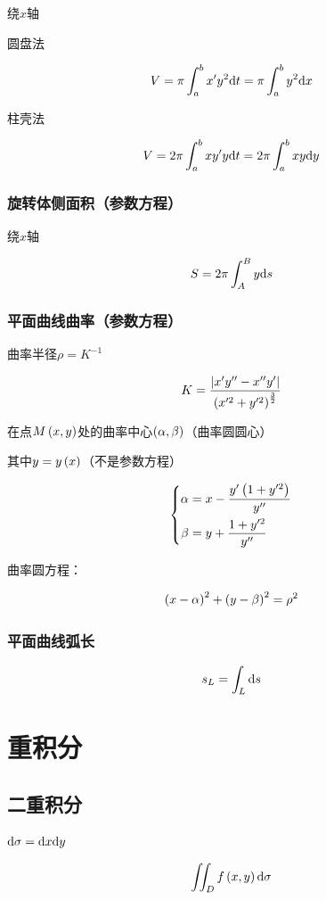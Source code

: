 \documentclass{article}
\begin{document}
绕$x$轴

圆盘法

\[V=\pi\int_a^bx^\prime y^2\mathrm d t=\pi\int_a^by^2\mathrm d x\]

柱壳法

\[V=2\pi\int_a^bxy^\prime y\mathrm d t=2\pi\int_a^bxy\mathrm d y\]

\subsubsection{旋转体侧面积（参数方程）}

绕$x$轴

\[S=2\pi\int_A^By\mathrm d s\]

\subsubsection{平面曲线曲率（参数方程）}

曲率半径$\rho=K^{-1}$

\[K=\frac{\left|x^\prime y^{\prime\prime}-x^{\prime\prime}y^\prime\right|}{\left(x^{\prime2}+y^{\prime2}\right)^\frac32}\]

在点$M\left(x,y\right)$处的曲率中心$\left(\alpha,\beta\right)$（曲率圆圆心）

其中$y=y\left(x\right)$（不是参数方程）

\[\left\{\begin{aligned}
        \alpha & =x-\frac{y^\prime\left(1+y^{\prime2}\right)}{y^{\prime\prime}} \\
        \beta  & =y+\frac{1+y^{\prime2}}{y^{\prime\prime}}
    \end{aligned}\right.\]

曲率圆方程：

\[\left(x-\alpha\right)^2+\left(y-\beta\right)^2=\rho^2\]

\subsubsection{平面曲线弧长}

\[s_L=\int_L\mathrm d s\]

\section{重积分}

\subsection{二重积分}

$\mathrm d\sigma=\mathrm d x\mathrm d y$

\[\iint_Df\left(x,y\right)\mathrm d\sigma\]
\end{document}
